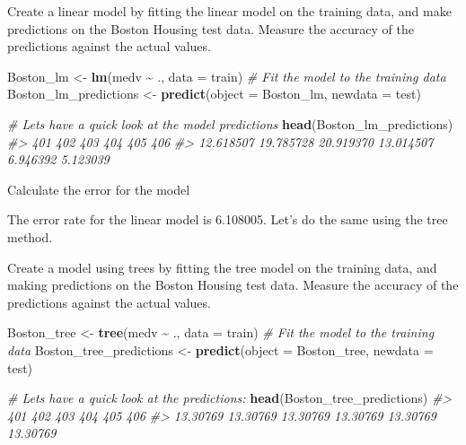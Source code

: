 \documentclass[
]{book}
\newenvironment{Shaded}{\begin{snugshade}}{\end{snugshade}}
\newcommand{\AttributeTok}[1]{\textcolor[rgb]{0.13,0.29,0.53}{#1}}
\newcommand{\CommentTok}[1]{\textcolor[rgb]{0.56,0.35,0.01}{\textit{#1}}}
\newcommand{\FunctionTok}[1]{\textcolor[rgb]{0.13,0.29,0.53}{\textbf{#1}}}
\newcommand{\NormalTok}[1]{#1}
\newcommand{\OtherTok}[1]{\textcolor[rgb]{0.56,0.35,0.01}{#1}}
\newcommand{\SpecialCharTok}[1]{\textcolor[rgb]{0.81,0.36,0.00}{\textbf{#1}}}
\begin{document}
Create a linear model by fitting the linear model on the training data,
and make predictions on the Boston Housing test data. Measure the
accuracy of the predictions against the actual values.

\begin{Shaded}
\begin{Highlighting}[]
\NormalTok{Boston\_lm }\OtherTok{\textless{}{-}} \FunctionTok{lm}\NormalTok{(medv }\SpecialCharTok{\textasciitilde{}}\NormalTok{ ., }\AttributeTok{data =}\NormalTok{ train) }\CommentTok{\# Fit the model to the training data}
\NormalTok{Boston\_lm\_predictions }\OtherTok{\textless{}{-}} \FunctionTok{predict}\NormalTok{(}\AttributeTok{object =}\NormalTok{ Boston\_lm, }\AttributeTok{newdata =}\NormalTok{ test)}

\CommentTok{\# Let\textquotesingle{}s have a quick look at the model predictions}
\FunctionTok{head}\NormalTok{(Boston\_lm\_predictions)}
\CommentTok{\#\textgreater{}       401       402       403       404       405       406 }
\CommentTok{\#\textgreater{} 12.618507 19.785728 20.919370 13.014507  6.946392  5.123039}
\end{Highlighting}
\end{Shaded}

Calculate the error for the model

\begin{Shaded}
\end{Shaded}

The error rate for the linear model is 6.108005. Let's do the same using
the tree method.

Create a model using trees by fitting the tree model on the training
data, and making predictions on the Boston Housing test data. Measure
the accuracy of the predictions against the actual values.

\begin{Shaded}
\begin{Highlighting}[]
\NormalTok{Boston\_tree }\OtherTok{\textless{}{-}} \FunctionTok{tree}\NormalTok{(medv }\SpecialCharTok{\textasciitilde{}}\NormalTok{ ., }\AttributeTok{data =}\NormalTok{ train) }\CommentTok{\# Fit the model to the training data}
\NormalTok{Boston\_tree\_predictions }\OtherTok{\textless{}{-}} \FunctionTok{predict}\NormalTok{(}\AttributeTok{object =}\NormalTok{ Boston\_tree, }\AttributeTok{newdata =}\NormalTok{ test)}

\CommentTok{\# Let\textquotesingle{}s have a quick look at the predictions:}
\FunctionTok{head}\NormalTok{(Boston\_tree\_predictions)}
\CommentTok{\#\textgreater{}      401      402      403      404      405      406 }
\CommentTok{\#\textgreater{} 13.30769 13.30769 13.30769 13.30769 13.30769 13.30769}
\end{Highlighting}
\end{Shaded}
\end{document}
